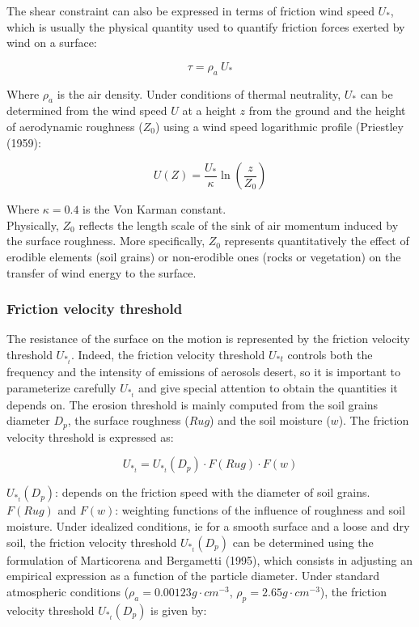 The shear constraint can also be expressed in terms of friction wind speed
$U_*$, which is usually the physical quantity used to quantify
friction forces exerted by wind on a surface:

\begin{equation}
\tau = \rho_{a}~U_{*}
\end{equation}


Where $\rho_{a}$ is the air density.
Under conditions of thermal neutrality, $U_*$ can be determined from the wind speed
$U$ at a height $z$ from the ground and the height of aerodynamic roughness ($Z_0$) using a
wind speed logarithmic profile (Priestley (1959)\nocite{Priestley1959}:

\begin{equation}
U(Z) = \frac{U_*}{\kappa}\ln(\frac{z}{Z_0})
\end{equation}


Where $\kappa=0.4$ is the Von Karman constant. \\
Physically, $Z_0$ reflects the length scale of the sink of air momentum
induced by the surface roughness. More specifically, $Z_0$ represents quantitatively the effect
of erodible elements (soil grains) or non-erodible ones (rocks or vegetation) on the transfer
of wind energy to the surface.

\subsubsection{Friction velocity threshold }

The resistance of the surface on the motion is represented by the 
friction velocity threshold $U_{*_t}$. Indeed, the friction velocity threshold $U_{*t}$ controls both the frequency and
the intensity of emissions of aerosols desert, so it is important to parameterize carefully
$U_{*_t}$ and give special attention to obtain the quantities it depends on.
The erosion threshold is mainly computed from the soil grains diameter $D_p$, the surface roughness
($Rug$) and the soil moisture ($w$).
The friction velocity threshold is expressed as:

\begin{equation}
U_{*_t} = U_{*_t}(D_p) \cdot F(Rug) \cdot F(w)
\end{equation}


	
$U_{*_t}(D_p)$: depends on the friction speed with the diameter of soil grains.
$F(Rug)$ and $F(w)$: weighting functions of the influence of roughness and soil moisture.
Under idealized conditions, ie for a smooth surface and a loose and dry soil, the
friction velocity threshold $U_{*_t}(D_p)$ can be determined using the formulation of
Marticorena and Bergametti (1995), which consists in adjusting an empirical expression
as a function of the particle diameter. Under standard atmospheric conditions
($\rho_a = 0.00123 g \cdot cm^{-3}$, $\rho_p = 2.65 g \cdot cm^{-3}$), the friction velocity threshold $U_{*_t}(D_p)$ is
given by:

